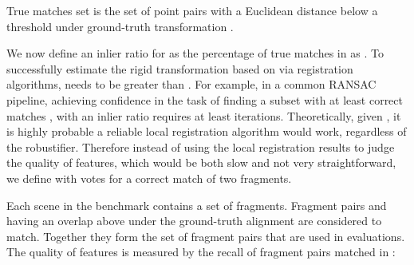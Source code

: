True matches set  is the set of point pairs with a Euclidean distance below a threshold  under ground-truth transformation  .

We now define an inlier ratio for  as the percentage of true matches in  as .
To successfully estimate the rigid transformation based on  via registration algorithms,  needs to be greater than . For example, in a common RANSAC pipeline, achieving  confidence in the task of finding a subset with at least  correct matches , with an inlier ratio  requires at least  iterations. Theoretically, given  , it is highly probable a reliable local registration algorithm would work, regardless of the robustifier. Therefore instead of using the local registration results to judge the quality of features, which would be both slow and not very straightforward, we define  with  votes for a correct match of two fragments.

Each scene in the benchmark contains a set of fragments. Fragment pairs  and  having an overlap above  under the ground-truth alignment are considered to match.  Together they form the set of fragment pairs  that are used in evaluations. The quality of features is measured by the recall  of fragment pairs matched in :


